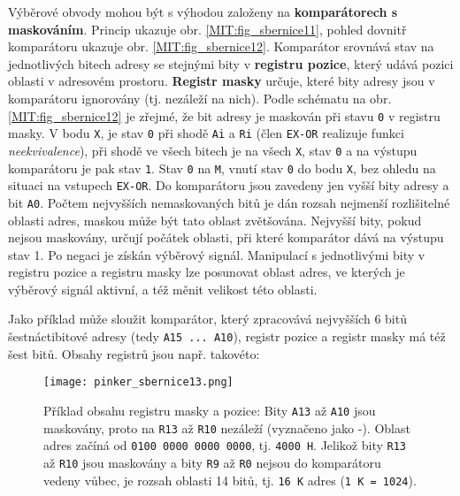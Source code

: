       Výběrové obvody mohou být s výhodou založeny na \textbf{komparátorech s maskováním}. Princip 
      ukazuje obr. \ref{MIT:fig_sbernice11}, pohled dovnitř komparátoru ukazuje obr. 
      \ref{MIT:fig_sbernice12}. Komparátor srovnává stav na jednotlivých bitech adresy se stejnými 
      bity v \textbf{registru pozice}, který udává pozici oblasti v adresovém prostoru. 
      \textbf{Registr masky} určuje, které bity adresy jsou v komparátoru ignorovány (tj. nezáleží 
      na nich). Podle schématu na obr. \ref{MIT:fig_sbernice12} je zřejmé, že bit adresy je 
      maskován při stavu \texttt{0} v registru masky. V bodu \texttt{X}, je stav \texttt{0} při 
      shodě \texttt{Ai} a \texttt{Ri} (člen \texttt{EX-OR} realizuje funkci   
      \emph{neekvivalence}), při shodě ve všech bitech je na všech \texttt{X}, stav \texttt{0} a na 
      výstupu komparátoru je pak stav \texttt{1}. Stav \texttt{0} na \texttt{M}, vnutí stav 
      \texttt{0} do bodu \texttt{X}, bez ohledu na situaci na vstupech \texttt{EX-OR}. Do 
      komparátoru jsou zavedeny jen vyšší bity adresy a bit \texttt{A0}. Počtem nejvyšších 
      nemaskovaných bitů je dán rozsah nejmenší rozlišitelné oblasti adres, maskou může být tato 
      oblast zvětšována. Nejvyšší bity, pokud nejsou maskovány, určují počátek oblasti, při které 
      komparátor dává na výstupu stav 1. Po negaci je získán výběrový signál. Manipulací s 
      jednotlivými bity v registru pozice a registru masky lze posunovat oblast adres, ve 
      kterých je výběrový signál aktivní, a též měnit velikost této oblasti.
      
      Jako příklad může sloužit komparátor, který zpracovává nejvyšších 6 bitů šestnáctibitové 
      adresy (tedy  \texttt{A15 ... A10}), registr pozice a registr masky má též šest bitů. Obsahy 
      registrů jsou např. takovéto:
      \begin{figure}[ht!] %
        \centering
        \texttt{[image: pinker\_sbernice13.png]}
        \caption{Příklad obsahu registru masky a pozice: Bity \texttt{A13} až \texttt{A10} jsou     
                 maskovány, proto na \texttt{R13} až \texttt{R10} nezáleží (vyznačeno jako -). 
                 Oblast adres začíná od \texttt{0100 0000 0000 0000}, tj. \texttt{4000 H}. 
                 Jelikož bity \texttt{R13} až \texttt{R10} jsou maskovány a bity \texttt{R9} až 
                 \texttt{R0} nejsou do komparátoru vedeny vůbec, je rozsah oblasti 14 bitů, tj. 
                 \texttt{16 K} adres (\texttt{1 K = 1024}).}
        \label{MIT:fig_sbernic13}
      \end{figure}
      
